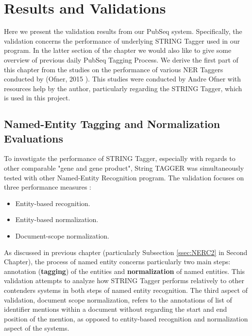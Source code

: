 
\chapter{Results and Validations} %

\label{Chapter7} %


Here we present the validation results from our PubSeq system. Specifically, the validation concerns the performance of underlying STRING Tagger used in our program. In the latter section of the chapter we would also like to give some overview of previous daily PubSeq Tagging Process. We derive the first part of this chapter from the studies on the performance of various NER Taggers conducted by (Ofner, 2015 \citep{ofner2015evaluation}). This studies were conducted by Andre Ofner with resources help by the author, particularly regarding the STRING Tagger, which is used in this project.

\section{Named-Entity Tagging and Normalization Evaluations}

To investigate the performance of STRING Tagger, especially with regards to other comparable "gene and gene product", String TAGGER was simultaneously tested with other Named-Entity Recognition program. The validation focuses on three performance measures \citep{ofner2015evaluation}: 

\begin{itemize}
\item Entity-based recognition.
\item Entity-based normalization.
\item Document-scope normalization.
\end{itemize}

As discussed in previous chapter (particularly Subsection \ref{ssec:NERC2} in Second Chapter), the process of named entity concerns particularly two main steps: annotation (\textbf{tagging}) of the entities and \textbf{normalization} of named entities. This validation attempts to analyze how STRING Tagger performs relatively to other contenders systems in both steps of named entity recognition. The third aspect of validation, document scope normalization, refers to the annotations of list of identifier mentions within a document without regarding the start and end position of the mention, as opposed to entity-based recognition and normalization aspect of the systems.

